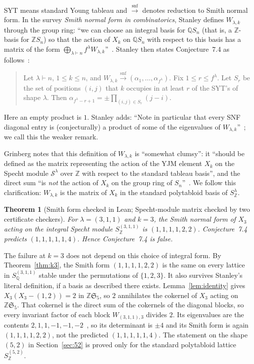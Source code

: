 \documentclass[11pt]{article}
\newtheorem{theorem}{Theorem}
\theoremstyle{remark}
\newcommand{\Z}{\mathbb{Z}}
\newcommand{\Q}{\mathbb{Q}}
\newcommand{\snf}{\stackrel{\mathrm{snf}}{\rightarrow}}
\begin{document}
SYT means standard Young tableau and $\snf$ denotes reduction to Smith
normal form. In the survey \emph{Smith normal form in combinatorics}, Stanley
defines $W_{\lambda,k}$ through the group ring: ``we can choose an integral
basis for $\Q S_n$ (that is, a $\Z$-basis for $\Z S_n$) so that the action of
$X_k$ on $\Q S_n$ with respect to this basis has a matrix of the form
$\bigoplus_{\lambda\vdash n}f^\lambda W_{\lambda,k}$''~\cite[Section~7,
page~15]{stanley}. Stanley then states Conjecture~7.4 as
follows~\cite[Conjecture~7.4]{stanley}:
\begin{quote}
Let $\lambda\vdash n$, $1\leq k\leq n$, and
$W_{\lambda,k}\snf (\alpha_1,\dots,\alpha_{f^\lambda})$. Fix
$1\leq r\leq f^\lambda$. Let $S_r$ be the set of positions $(i,j)$ that $k$
occupies in at least $r$ of the SYT's of shape $\lambda$. Then
$\alpha_{f^\lambda-r+1}=\pm\prod_{(i,j)\in S_r}(j-i)$.
\end{quote}
Here an empty product is $1$. Stanley adds: ``Note in particular that every
SNF diagonal entry is (conjecturally) a product of some of the eigenvalues of
$W_{\lambda,k}$''~\cite[Section~7, page~15]{stanley}; we call this the weaker
remark.

Grinberg notes that this definition of $W_{\lambda,k}$ is ``somewhat
clumsy'': it ``should be defined as the matrix representing the action of the
YJM element $X_k$ on the Specht module $\mathcal{S}^\lambda$ over $\Z$ with
respect to the standard tableau basis'', and the direct sum ``is \emph{not}
the action of $X_k$ on the group ring of $S_n$''~\cite[comment~1262855]{mo}.
We follow this clarification: $W_{\lambda,k}$ is the matrix of $X_k$ in the
standard polytabloid basis of $S^\lambda_\Z$.

\begin{theorem}[Smith form checked in Lean; Specht-module matrix checked by two certificate checkers]\label{thm:main}
For $\lambda=(3,1,1)$ and $k=3$, the Smith normal form of $X_3$ acting on the
integral Specht module $S^{(3,1,1)}_\Z$ is $(1,1,1,1,2,2)$. Conjecture~7.4
predicts $(1,1,1,1,1,4)$. Hence Conjecture~7.4 is false.
\end{theorem}

The failure at $k=3$ does not depend on this choice of integral form. By
Theorem~\ref{thm:k3}, the Smith form $(1,1,1,1,2,2)$ is the same on every
lattice in $S^{(3,1,1)}_\Q$ stable under the permutations of $\{1,2,3\}$. It
also survives Stanley's literal definition, if a basis as described there
exists. Lemma~\ref{lem:identity} gives $X_3(X_3-(1,2))=2$ in $\Z\mathfrak S_5$,
so $2$ annihilates the cokernel of $X_3$ acting on $\Z\mathfrak S_5$. That
cokernel is the direct sum of the cokernels of the diagonal blocks, so every
invariant factor of each block $W_{(3,1,1),3}$ divides $2$. Its eigenvalues
are the contents $2,1,1,-1,-1,-2$~\cite[Section~7, page~15]{stanley}, so its
determinant is $\pm4$ and its Smith form is again $(1,1,1,1,2,2)$, not the
predicted $(1,1,1,1,1,4)$. The statement on the shape $(5,2)$ in
Section~\ref{sec:52} is proved only for the standard polytabloid lattice
$S^{(5,2)}_\Z$.
\end{document}
